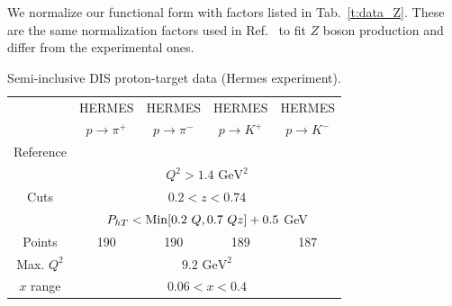 \documentclass[aps,preprintnumbers,showpacs,nofootinbib,superscriptaddress,floatfix]{revtex4}
\newcommand{\Tperp}{T}
\begin{document}
We normalize our functional form with factors listed in Tab.~\ref{t:data_Z}. These are the same normalization factors used in Ref.~\cite{DAlesio:2014mrz} to fit $Z$ boson production and differ from the experimental ones. 



\renewcommand{\tabcolsep}{0.4pc} %
\renewcommand{\arraystretch}{1.3} %

\begin{table}[h!]
\begin{center}
\begin{tabular}{|c|c|c|c|c|}
 \hline
  & HERMES & HERMES & HERMES & HERMES \\
 ~          &  $p \to \pi^+$    &   $p \to \pi^-$    &  $p \to K^+$    &   $p \to K^-$               \\
 \hline
 Reference & \multicolumn{4}{c|}{\cite{Airapetian:2012ki}}        \\
\hline
\multirow{3}{*}{Cuts}             & \multicolumn{4}{c|}{$Q^2 > 1.4 \text{ GeV}^2$}     \\
             & \multicolumn{4}{c|}{$0.2 <z <0.74$}     \\
             & \multicolumn{4}{c|}{$P_{h \Tperp}< {\rm Min}[0.2\ Q, 0.7 \ Q z ] +0.5$ GeV}     \\
\hline
 Points         &  190 & 190 & 189 & 187       \\
 \hline
Max. $Q^2$      &  \multicolumn{4}{c|}{$9.2 \text{ GeV}^2 $}               \\
 \hline
$x$ range       & \multicolumn{4}{c|}{$0.06 < x < 0.4$ }                \\
\hline
\end{tabular}
\caption{Semi-inclusive DIS proton-target data (Hermes experiment).}
\label{t:data_SIDIS_proton}
\end{center}
\end{table}
\end{document}
